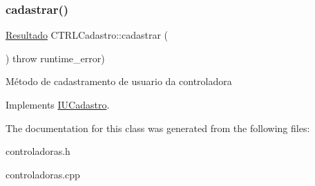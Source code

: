\subsubsection{\texorpdfstring{cadastrar()}{cadastrar()}}
{\footnotesize\ttfamily \hyperlink{classResultado}{Resultado} C\+T\+R\+L\+Cadastro\+::cadastrar (\begin{DoxyParamCaption}{ }\end{DoxyParamCaption}) throw  runtime\+\_\+error) \hspace{0.3cm}{\ttfamily [virtual]}}

Método de cadastramento de usuario da controladora 

Implements \hyperlink{classIUCadastro}{I\+U\+Cadastro}.



The documentation for this class was generated from the following files\+:\begin{DoxyCompactItemize}
\item 
controladoras.\+h\item 
controladoras.\+cpp\end{DoxyCompactItemize}
